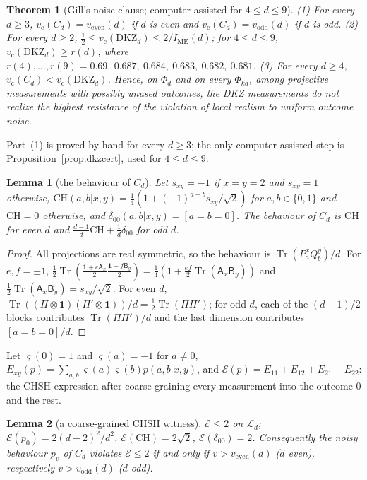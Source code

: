 \documentclass[11pt]{article}
\newtheorem{theorem}{Theorem}
\newtheorem{lemma}{Lemma}[section]
\theoremstyle{remark}
\numberwithin{equation}{section}
\newcommand{\Tr}{\operatorname{Tr}}
\newcommand{\IME}{I_{\mathrm{ME}}}
\newcommand{\one}{\mathbf{1}}
\newcommand{\cL}{\mathcal{L}}
\newcommand{\cE}{\mathcal{E}}
\newcommand{\vc}{v_{\mathrm c}}
\newcommand{\veven}{v_{\mathrm{even}}}
\newcommand{\vodd}{v_{\mathrm{odd}}}
\newcommand{\CH}{\mathrm{CH}}
\newcommand{\DKZ}{\mathrm{DKZ}}
\newcommand{\sA}{\mathsf{A}}
\newcommand{\sB}{\mathsf{B}}
\begin{document}
\begin{theorem}[Gill's noise clause; computer-assisted for $4\le d\le9$]\label{thm:literal}
\textup{(1)} For every $d\ge3$, $\vc(C_d)=\veven(d)$ if $d$ is even and $\vc(C_d)=\vodd(d)$ if $d$ is odd.
\textup{(2)} For every $d\ge2$, $\frac12\le\vc(\DKZ_d)\le2/\IME(d)$; for $4\le d\le9$, $\vc(\DKZ_d)\ge r(d)$, where
$r(4),\dots,r(9)=0.69,\ 0.687,\ 0.684,\ 0.683,\ 0.682,\ 0.681$.
\textup{(3)} For every $d\ge4$, $\vc(C_d)<\vc(\DKZ_d)$. Hence, on $\Phi_d$ and on every $\Phi_{kd}$, among projective
measurements with possibly unused outcomes, the DKZ measurements do not realize the highest resistance of the violation
of local realism to uniform outcome noise.
\end{theorem}

Part~(1) is proved by hand for every $d\ge3$; the only computer-assisted step is Proposition~\ref{prop:dkzcert}, used for
$4\le d\le9$.

\begin{lemma}[the behaviour of $C_d$]\label{lem:Cbeh}
Let $s_{xy}=-1$ if $x=y=2$ and $s_{xy}=1$ otherwise, $\CH(a,b|x,y)=\frac14(1+(-1)^{a+b}s_{xy}/\sqrt2)$ for $a,b\in\{0,1\}$
and $\CH=0$ otherwise, and $\delta_{00}(a,b|x,y)=[a=b=0]$. The behaviour of $C_d$ is $\CH$ for even $d$ and
$\frac{d-1}d\CH+\frac1d\delta_{00}$ for odd $d$.
\end{lemma}

\begin{proof}
All projections are real symmetric, so the behaviour is $\Tr(P^x_aQ^y_b)/d$. For $e,f=\pm1$,
$\frac12\Tr(\frac{\one+e\sA_x}2\frac{\one+f\sB_y}2)=\frac14(1+\frac{ef}2\Tr(\sA_x\sB_y))$ and
$\frac12\Tr(\sA_x\sB_y)=s_{xy}/\sqrt2$. For even $d$, $\Tr((\Pi\otimes\one)(\Pi'\otimes\one))/d=\frac12\Tr(\Pi\Pi')$; for odd
$d$, each of the $(d-1)/2$ blocks contributes $\Tr(\Pi\Pi')/d$ and the last dimension contributes $[a=b=0]/d$.
\end{proof}

Let $\varsigma(0)=1$ and $\varsigma(a)=-1$ for $a\ne0$, $E_{xy}(p)=\sum_{a,b}\varsigma(a)\varsigma(b)p(a,b|x,y)$, and
$\cE(p)=E_{11}+E_{12}+E_{21}-E_{22}$: the CHSH expression after coarse-graining every measurement into the outcome $0$
and the rest.

\begin{lemma}[a coarse-grained CHSH witness]\label{lem:witness}
$\cE\le2$ on $\cL_d$; $\cE(p_0)=2(d-2)^2/d^2$, $\cE(\CH)=2\sqrt2$, $\cE(\delta_{00})=2$. Consequently the noisy behaviour
$p_v$ of $C_d$ violates $\cE\le2$ if and only if $v>\veven(d)$ \textup{(}$d$ even\textup{)}, respectively $v>\vodd(d)$
\textup{(}$d$ odd\textup{)}.
\end{lemma}
\end{document}
